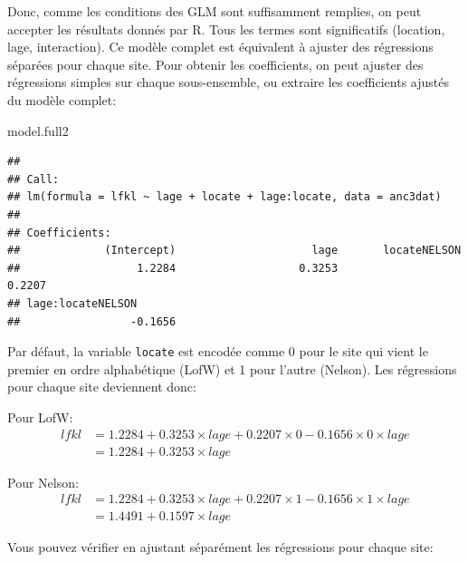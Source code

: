 \documentclass[12pt,]{book}
\newenvironment{Shaded}{\begin{snugshade}}{\end{snugshade}}
\newcommand{\ControlFlowTok}[1]{\textcolor[rgb]{0.13,0.29,0.53}{\textbf{#1}}}
\newcommand{\DataTypeTok}[1]{\textcolor[rgb]{0.13,0.29,0.53}{#1}}
\newcommand{\KeywordTok}[1]{\textcolor[rgb]{0.13,0.29,0.53}{\textbf{#1}}}
\newcommand{\NormalTok}[1]{#1}
\newcommand{\OperatorTok}[1]{\textcolor[rgb]{0.81,0.36,0.00}{\textbf{#1}}}
\begin{document}
Donc, comme les conditions des GLM sont suffisamment remplies, on peut accepter les résultats donnés par R. Tous les termes sont significatifs (location, lage, interaction). Ce modèle complet est équivalent à ajuster des régressions séparées pour chaque site. Pour obtenir les coefficients, on peut ajuster des régressions simples sur chaque sous-ensemble, ou extraire les coefficients ajustés du modèle complet:

\begin{Shaded}
\begin{Highlighting}[]
\NormalTok{model.full2}
\end{Highlighting}
\end{Shaded}

\begin{verbatim}
## 
## Call:
## lm(formula = lfkl ~ lage + locate + lage:locate, data = anc3dat)
## 
## Coefficients:
##             (Intercept)                     lage       locateNELSON        
##                  1.2284                   0.3253                   0.2207  
## lage:locateNELSON        
##                 -0.1656
\end{verbatim}

Par défaut, la variable \texttt{locate} est encodée comme 0 pour le site qui vient le premier en ordre alphabétique (LofW) et 1 pour l'autre (Nelson). Les régressions pour chaque site deviennent donc:

Pour LofW:
\[\begin{aligned}
lfkl &= 1.2284 + 0.3253 \times lage + 0.2207 \times 0 - 0.1656 \times 0 \times lage \\
 &= 1.2284 + 0.3253 \times lage
\end{aligned}\]

Pour Nelson:
\[\begin{aligned}
lfkl &= 1.2284 + 0.3253 \times lage + 0.2207 \times 1 - 0.1656 \times 1 \times lage \\
 &= 1.4491 + 0.1597 \times lage
\end{aligned}\]

Vous pouvez vérifier en ajustant séparément les régressions pour chaque site:

\begin{Shaded}
\end{Shaded}
\end{document}
